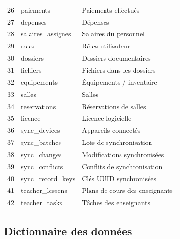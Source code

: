 \documentclass[12pt,a4paper,twoside]{report}
\begin{document}
\begin{longtable}{cll}
26 & paiements & Paiements effectués \\
27 & depenses & Dépenses \\
28 & salaires\_assignes & Salaires du personnel \\
29 & roles & Rôles utilisateur \\
30 & dossiers & Dossiers documentaires \\
31 & fichiers & Fichiers dans les dossiers \\
32 & equipements & Équipements / inventaire \\
33 & salles & Salles \\
34 & reservations & Réservations de salles \\
35 & licence & Licence logicielle \\
36 & sync\_devices & Appareils connectés \\
37 & sync\_batches & Lots de synchronisation \\
38 & sync\_changes & Modifications synchronisées \\
39 & sync\_conflicts & Conflits de synchronisation \\
40 & sync\_record\_keys & Clés UUID synchronisées \\
41 & teacher\_lessons & Plans de cours des enseignants \\
42 & teacher\_tasks & Tâches des enseignants \\
\end{longtable}

\subsection{Dictionnaire des données}
\end{document}

